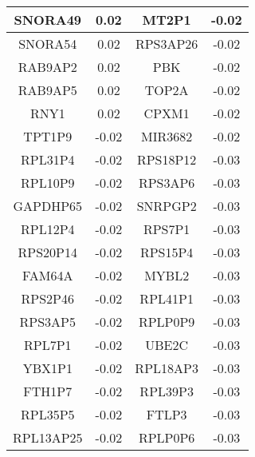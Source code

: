 \begin{longtable}{|c|c||c|c|}
		\hline
		SNORA49 & 0.02 & MT2P1 & -0.02 \\
		\hline
		SNORA54 & 0.02 & RPS3AP26 & -0.02 \\
		\hline
		RAB9AP2 & 0.02 & PBK & -0.02 \\
		\hline
		RAB9AP5 & 0.02 & TOP2A & -0.02 \\
		\hline
		RNY1 & 0.02 & CPXM1 & -0.02 \\
		\hline
		TPT1P9 & -0.02 & MIR3682 & -0.02 \\
		\hline
		RPL31P4 & -0.02 & RPS18P12 & -0.03 \\
		\hline
		RPL10P9 & -0.02 & RPS3AP6 & -0.03 \\
		\hline
		GAPDHP65 & -0.02 & SNRPGP2 & -0.03 \\
		\hline
		RPL12P4 & -0.02 & RPS7P1 & -0.03 \\
		\hline
		RPS20P14 & -0.02 & RPS15P4 & -0.03 \\
		\hline
		FAM64A & -0.02 & MYBL2 & -0.03 \\
		\hline
		RPS2P46 & -0.02 & RPL41P1 & -0.03 \\
		\hline
		RPS3AP5 & -0.02 & RPLP0P9 & -0.03 \\
		\hline
		RPL7P1 & -0.02 & UBE2C & -0.03 \\
		\hline
		YBX1P1 & -0.02 & RPL18AP3 & -0.03 \\
		\hline
		FTH1P7 & -0.02 & RPL39P3 & -0.03 \\
		\hline
		RPL35P5 & -0.02 & FTLP3 & -0.03 \\
		\hline
		RPL13AP25 & -0.02 & RPLP0P6 & -0.03 \\
		\hline
		
	\end{longtable}
